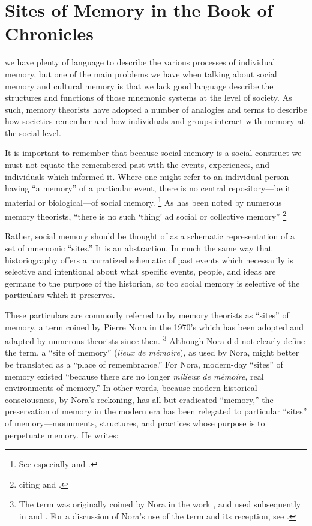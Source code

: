 
\section{Sites of Memory in the Book of Chronicles}


we have plenty of language to describe the various processes of individual memory, but one of the main problems we have when talking about social memory and cultural memory is that we lack good language describe the structures and functions of those mnemonic systems at the level of society. As such, memory theorists have adopted a number of analogies and terms to describe how societies remember and how individuals and groups interact with memory at the social level. 

It is important to remember that because social memory is a social construct we must not equate the remembered past with the events, experiences, and individuals which informed it. Where one might refer to an individual person having ``a memory'' of a particular event, there is no central repository---be it material or biological---of social memory.%
    \footnote{See especially \cite{brockmeier_cp2010} and \cite{wertsch_cp2011}.}  
As has been noted by numerous memory theorists, ``there is no such `thing' ad social or collective memory''%
    \footnote{\cite[14]{wilson2017} citing \cite[112]{olick-robbins_ars1998} and \cite[118--24]{wertsch_boyer-wertsch2009}.}


Rather, social memory should be thought of as a schematic representation of a set of mnemonic ``sites.'' It is an abstraction. In much the same way that historiography offers a narratized schematic of past events which necessarily is selective and intentional about what specific events, people, and ideas are germane to the purpose of the historian, so too social memory is selective of the particulars which it preserves. 

These particulars are commonly referred to by memory theorists as ``sites'' of memory, a term coined by Pierre Nora in the 1970's which has been adopted and adapted by numerous theorists since then.%
    \footnote{%
        The term was originally coined by Nora in the work
        \cite*{nora_goff-etal1978}, and used subsequently in 
        \cite*{nora1984} and 
        \cite*{nora_representations1989}. For a discussion of Nora's use of the term and its reception, see 
        \cite{szpociński_teksty-drugie2016}.}
Although Nora did not clearly define the term, a ``site of memory'' (\emph{lieux de mémoire}), as used by Nora, might better be translated as a ``place of remembrance.'' For Nora, modern-day ``sites'' of memory existed ``because there are no longer \emph{milieux de mémoire}, real environments of memory.''%
    \autocite[7]{nora_representations1989}
In other words, because modern historical consciousness, by Nora's reckoning, has all but eradicated ``memory,'' the preservation of memory in the modern era has been relegated to particular ``sites'' of memory---monuments, structures, and practices whose purpose is to perpetuate memory. He writes:

